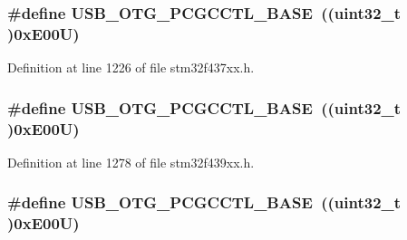 \subsubsection[{\texorpdfstring{U\+S\+B\+\_\+\+O\+T\+G\+\_\+\+P\+C\+G\+C\+C\+T\+L\+\_\+\+B\+A\+SE}{USB_OTG_PCGCCTL_BASE}}]{\setlength{\rightskip}{0pt plus 5cm}\#define U\+S\+B\+\_\+\+O\+T\+G\+\_\+\+P\+C\+G\+C\+C\+T\+L\+\_\+\+B\+A\+SE~((uint32\+\_\+t )0x\+E00\+U)}\hypertarget{group___peripheral__memory__map_gaa9766975aca084c257730879568bc7cf}{}\label{group___peripheral__memory__map_gaa9766975aca084c257730879568bc7cf}


Definition at line 1226 of file stm32f437xx.\+h.

\subsubsection[{\texorpdfstring{U\+S\+B\+\_\+\+O\+T\+G\+\_\+\+P\+C\+G\+C\+C\+T\+L\+\_\+\+B\+A\+SE}{USB_OTG_PCGCCTL_BASE}}]{\setlength{\rightskip}{0pt plus 5cm}\#define U\+S\+B\+\_\+\+O\+T\+G\+\_\+\+P\+C\+G\+C\+C\+T\+L\+\_\+\+B\+A\+SE~((uint32\+\_\+t )0x\+E00\+U)}\hypertarget{group___peripheral__memory__map_gaa9766975aca084c257730879568bc7cf}{}\label{group___peripheral__memory__map_gaa9766975aca084c257730879568bc7cf}


Definition at line 1278 of file stm32f439xx.\+h.

\subsubsection[{\texorpdfstring{U\+S\+B\+\_\+\+O\+T\+G\+\_\+\+P\+C\+G\+C\+C\+T\+L\+\_\+\+B\+A\+SE}{USB_OTG_PCGCCTL_BASE}}]{\setlength{\rightskip}{0pt plus 5cm}\#define U\+S\+B\+\_\+\+O\+T\+G\+\_\+\+P\+C\+G\+C\+C\+T\+L\+\_\+\+B\+A\+SE~((uint32\+\_\+t )0x\+E00\+U)}\hypertarget{group___peripheral__memory__map_gaa9766975aca084c257730879568bc7cf}{}\label{group___peripheral__memory__map_gaa9766975aca084c257730879568bc7cf}


